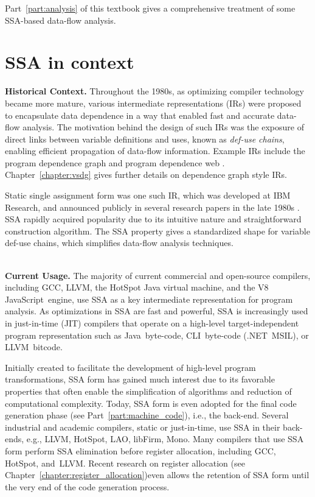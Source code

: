 Part~\ref{part:analysis} of this textbook gives a comprehensive treatment of some SSA-based data-flow analysis.




\section{SSA in context}

\textbf{Historical Context.}
Throughout the 1980s, as optimizing compiler technology became more mature, various intermediate representations (IRs) were proposed to encapsulate data dependence in a way that enabled fast and accurate data-flow analysis. 
The motivation behind the design of such IRs was the exposure of direct links between variable definitions and uses, known as \textit{def-use chains}, enabling efficient propagation of data-flow information. 
Example IRs include the program dependence graph \cite{ferrantePDG} and program dependence web \cite{ottenstein90program}. 
Chapter~\ref{chapter:vsdg} gives further details on dependence graph style IRs.

Static single assignment form was one such IR, which was developed at IBM Research, and announced publicly in several research papers in the late 1980s \cite{rosen88global,alpern88detecting,cytron89efficient}. 
SSA rapidly acquired popularity due to its intuitive nature and straightforward construction algorithm. 
The SSA property gives a standardized shape for variable def-use chains, which simplifies data-flow analysis techniques.

~\\ \textbf{Current Usage.}
The majority of current commercial and open-source compilers, including GCC, LLVM, the HotSpot Java virtual machine, and the V8 JavaScript~engine, use SSA as a key intermediate representation for program analysis. 
As optimizations in SSA are fast and powerful, SSA is increasingly used in just-in-time (JIT) compilers that operate on a high-level target-independent program representation such as Java~byte-code, CLI~byte-code (.NET~MSIL), or LLVM~bitcode.



Initially created to facilitate the development of high-level program transformations, SSA form has gained much interest due to its favorable properties that often enable the simplification of algorithms and reduction of computational complexity. 
Today, SSA form is even adopted for the final code generation phase (see Part~\ref{part:machine_code}), i.e., the back-end. 
Several industrial and academic compilers, static or just-in-time, use SSA in their back-ends, e.g., LLVM, HotSpot, LAO, libFirm, Mono. 
Many compilers that use SSA form perform SSA elimination before register allocation, including GCC, HotSpot, and~LLVM. 
Recent research on register allocation \ifregin (see Chapter~\ref{chapter:register_allocation})\fi even allows the retention of SSA form until the very end of the code generation process.

